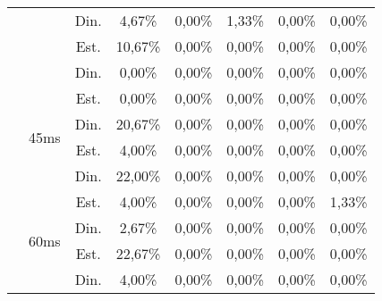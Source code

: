 \begin{center}
\begin{longtable}{|c|c|c|ccccc|}
 &  & Din. & 4,67\% & 0,00\% & 1,33\% & 0,00\% & 0,00\% \\
 &  & Est. & 10,67\% & 0,00\% & 0,00\% & 0,00\% & 0,00\% \\
 &  & Din. & 0,00\% & 0,00\% & 0,00\% & 0,00\% & 0,00\% \\ \cline{2-8} 
 & \multirow{4}{*}{45ms} & Est. & 0,00\% & 0,00\% & 0,00\% & 0,00\% & 0,00\% \\
 &  & Din. & 20,67\% & 0,00\% & 0,00\% & 0,00\% & 0,00\% \\
 &  & Est. & 4,00\% & 0,00\% & 0,00\% & 0,00\% & 0,00\% \\
 &  & Din. & 22,00\% & 0,00\% & 0,00\% & 0,00\% & 0,00\% \\ \cline{2-8} 
 & \multirow{4}{*}{60ms} & Est. & 4,00\% & 0,00\% & 0,00\% & 0,00\% & 1,33\% \\
 &  & Din. & 2,67\% & 0,00\% & 0,00\% & 0,00\% & 0,00\% \\
 &  & Est. & 22,67\% & 0,00\% & 0,00\% & 0,00\% & 0,00\% \\
 &  & Din. & 4,00\% & 0,00\% & 0,00\% & 0,00\% & 0,00\% \\ \hline
\end{longtable}
\end{center}

